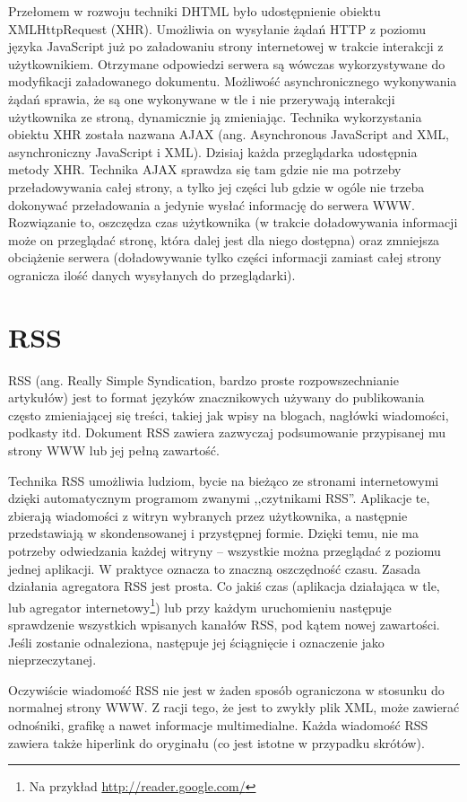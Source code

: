 \documentclass[a4paper,12pt,oneside]{report}
\begin{document}
Przełomem w rozwoju techniki DHTML było udostępnienie obiektu XMLHttpRequest (XHR). Umożliwia on wysyłanie żądań HTTP z poziomu języka JavaScript już po załadowaniu strony internetowej w trakcie interakcji z użytkownikiem. Otrzymane odpowiedzi serwera są wówczas wykorzystywane do modyfikacji załadowanego dokumentu. Możliwość asynchronicznego wykonywania żądań sprawia, że są one wykonywane w tle i nie przerywają interakcji użytkownika ze stroną, dynamicznie ją zmieniając. Technika wykorzystania obiektu XHR została nazwana AJAX (ang. Asynchronous JavaScript and XML, asynchroniczny JavaScript i XML). Dzisiaj każda przeglądarka udostępnia metody XHR. Technika AJAX sprawdza się tam gdzie nie ma potrzeby przeładowywania całej strony, a tylko jej części lub gdzie w ogóle nie trzeba dokonywać przeładowania a jedynie wysłać informację do serwera WWW. Rozwiązanie to, oszczędza czas użytkownika (w trakcie doładowywania informacji może on przeglądać stronę, która dalej jest dla niego dostępna) oraz zmniejsza obciążenie serwera (doładowywanie tylko części informacji zamiast całej strony ogranicza ilość danych wysyłanych do przeglądarki). 

\section{RSS}
\label{sec:rss}
RSS (ang. Really Simple Syndication, bardzo proste rozpowszechnianie artykułów) jest to format języków znacznikowych używany do publikowania często zmieniającej się treści, takiej jak wpisy na blogach, nagłówki wiadomości, podkasty itd. Dokument RSS zawiera zazwyczaj podsumowanie przypisanej mu strony WWW lub jej pełną zawartość. 

Technika RSS umożliwia ludziom, bycie na bieżąco ze stronami internetowymi dzięki automatycznym programom zwanymi ,,czytnikami RSS''. Aplikacje te, zbierają wiadomości z witryn wybranych przez użytkownika, a następnie przedstawiają w skondensowanej i przystępnej formie. Dzięki temu, nie ma potrzeby odwiedzania każdej witryny -- wszystkie można przeglądać z poziomu jednej aplikacji. W praktyce oznacza to znaczną oszczędność czasu. Zasada działania agregatora RSS jest prosta. Co jakiś czas (aplikacja działająca w tle, lub agregator internetowy\footnote{Na przykład \url{http://reader.google.com/}}) lub przy każdym uruchomieniu następuje sprawdzenie wszystkich wpisanych kanałów RSS, pod kątem nowej zawartości. Jeśli zostanie odnaleziona, następuje jej ściągnięcie i oznaczenie jako nieprzeczytanej. 

Oczywiście wiadomość RSS nie jest w żaden sposób ograniczona w stosunku do normalnej strony WWW. Z racji tego, że jest to zwykły plik XML, może zawierać odnośniki, grafikę a nawet informacje multimedialne. Każda wiadomość RSS zawiera także hiperlink do oryginału (co jest istotne w przypadku skrótów). 
\end{document}
